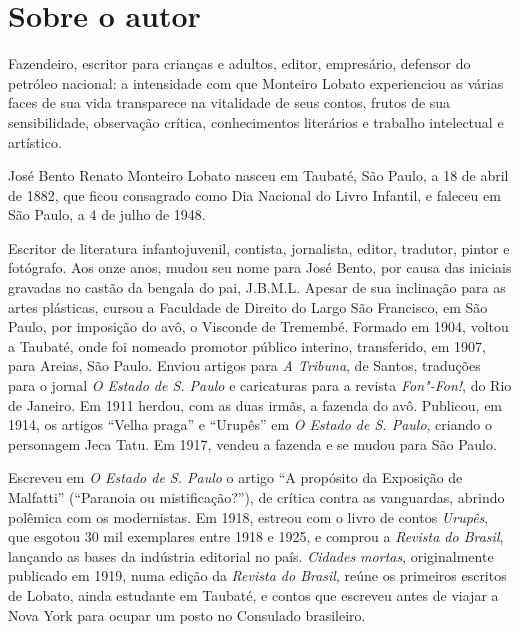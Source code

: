 
\section{Sobre o autor}

Fazendeiro, escritor para crianças e adultos, editor, empresário,
defensor do petróleo nacional: a intensidade com que Monteiro Lobato
experienciou as várias faces de sua vida transparece na vitalidade de
seus contos, frutos de sua sensibilidade, observação crítica,
conhecimentos literários e trabalho intelectual e artístico.

José Bento Renato Monteiro Lobato nasceu em Taubaté, São Paulo, a 18 de
abril de 1882, que ficou consagrado como Dia Nacional do Livro Infantil,
e faleceu em São Paulo, a 4 de julho de 1948.

Escritor de literatura infantojuvenil, contista, jornalista, editor,
tradutor, pintor e fotógrafo. Aos onze anos, mudou seu nome para José
Bento, por causa das iniciais gravadas no castão da bengala do pai,
J.B.M.L. Apesar de sua inclinação para as artes plásticas, cursou a
Faculdade de Direito do Largo São Francisco, em São Paulo, por imposição
do avô, o Visconde de Tremembé. Formado em 1904, voltou a Taubaté, onde
foi nomeado promotor público interino, transferido, em 1907, para
Areias, São Paulo. Enviou artigos para \emph{A Tribuna}, de Santos,
traduções para o jornal \emph{O Estado de S. Paulo} e caricaturas para a
revista \emph{Fon"-Fon!}, do Rio de Janeiro. Em 1911 herdou, com as duas
irmãs, a fazenda do avô. Publicou, em 1914, os artigos ``Velha praga'' e
``Urupês'' em \emph{O Estado de S. Paulo}, criando o personagem Jeca
Tatu. Em 1917, vendeu a fazenda e se mudou para São Paulo.

Escreveu em \emph{O Estado de S. Paulo} o artigo ``A propósito da
Exposição de Malfatti'' (``Paranoia ou mistificação?''), de crítica
contra as vanguardas, abrindo polêmica com os modernistas. Em 1918,
estreou com o livro de contos \emph{Urupês}, que esgotou 30 mil
exemplares entre 1918 e 1925, e comprou a \emph{Revista do Brasil},
lançando as bases da indústria editorial no país. \emph{Cidades mortas},
originalmente publicado em 1919, numa edição da \emph{Revista do
Brasil}, reúne os primeiros escritos de Lobato, ainda estudante em
Taubaté, e contos que escreveu antes de viajar a Nova York para ocupar
um posto no Consulado brasileiro.

